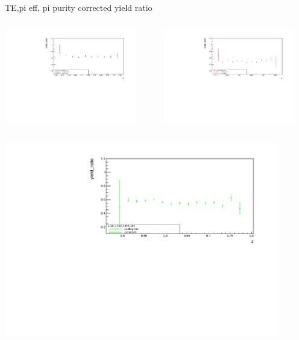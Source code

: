 \begin{frame}{TE,pi eff, pi purity corrected yield ratio}
\begin{columns}
\begin{column}[T]{0.5\textwidth}
\includegraphics[width = 0.9\textwidth]{results/yield/statistics_corr/x_Q2_z_50_5000_40_ratio.pdf}
\end{column}
\begin{column}[T]{0.5\textwidth}
\includegraphics[width = 0.9\textwidth]{results/yield/statistics_corr/x_Q2_z_50_5000_50_ratio.pdf}
\end{column}
\end{columns}
\begin{columns}
\begin{column}[T]{0.5\textwidth}
\includegraphics[width = 0.9\textwidth]{results/yield/statistics_corr/x_Q2_z_50_5000_60_ratio.pdf}

\end{column}
\end{columns}
\end{frame}
